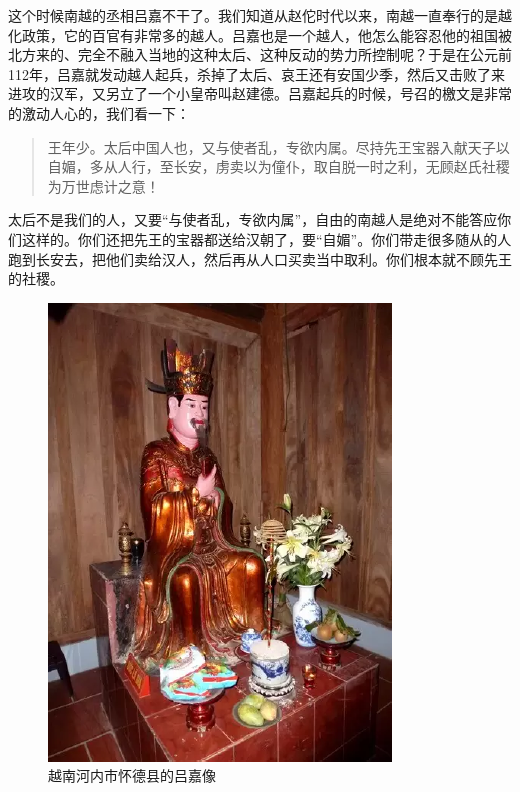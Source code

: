 这个时候南越的丞相吕嘉不干了。我们知道从赵佗时代以来，南越一直奉行的是越化政策，它的百官有非常多的越人。吕嘉也是一个越人，他怎么能容忍他的祖国被北方来的、完全不融入当地的这种太后、这种反动的势力所控制呢？于是在公元前112年，吕嘉就发动越人起兵，杀掉了太后、哀王还有安国少季，然后又击败了来进攻的汉军，又另立了一个小皇帝叫赵建德。吕嘉起兵的时候，号召的檄文是非常的激动人心的，我们看一下：

\begin{quote}
王年少。太后中国人也，又与使者乱，专欲内属。尽持先王宝器入献天子以自媚，多从人行，至长安，虏卖以为僮仆，取自脱一时之利，无顾赵氏社稷为万世虑计之意！
\end{quote}

太后不是我们的人，又要“与使者乱，专欲内属”，自由的南越人是绝对不能答应你们这样的。你们还把先王的宝器都送给汉朝了，要“自媚”。你们带走很多随从的人跑到长安去，把他们卖给汉人，然后再从人口买卖当中取利。你们根本就不顾先王的社稷。


\begin{figure}
	\centering
	\includegraphics[width=\textwidth]{images/image-13}
	\caption{越南河内市怀德县的吕嘉像}
\end{figure}

